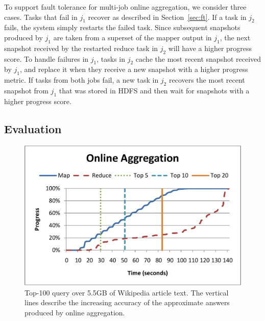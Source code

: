 To support fault tolerance for multi-job online aggregation, we consider three
cases. Tasks that fail in $j_1$ recover as described in Section~\ref{sec:ft}.
If a task in $j_2$ fails, the system simply restarts the failed task. Since
subsequent snapshots produced by $j_1$ are taken from a superset of the mapper
output in $j_1$, the next snapshot received by the restarted reduce task in
$j_2$ will have a higher progress score. To handle failures in $j_1$, tasks in
$j_2$ cache the most recent snapshot received by $j_1$, and replace it when they
receive a new snapshot with a higher progress metric. If tasks from both jobs
fail, a new task in $j_2$ recovers the most recent snapshot from $j_1$ that was
stored in HDFS and then wait for snapshots with a higher progress score.


  
  
\subsection{Evaluation}
\label{sec:online-eval}

\begin{figure}
  \centering
    \includegraphics[width=0.95\linewidth]{eval/top100_online_wiki}
    \caption{Top-100 query over 5.5GB of Wikipedia article text. The vertical
      lines describe the increasing accuracy of the approximate answers produced
      by online aggregation.}
\label{fig:topkonlinewiki}
\vspace{-10pt}
\end{figure}

